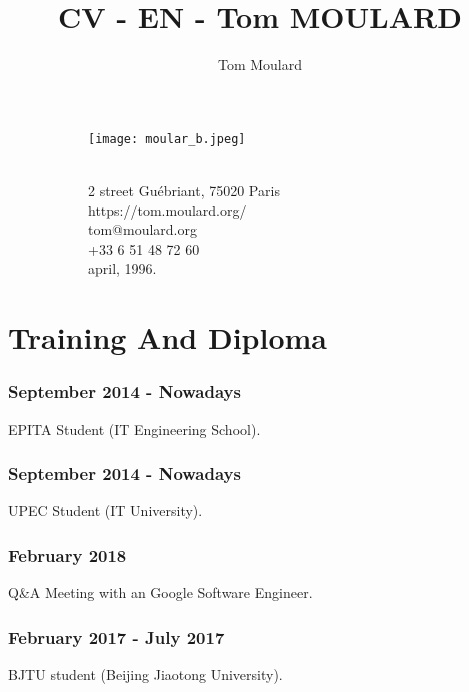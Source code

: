 \documentclass{article}
\begin{document}
    \title{CV - EN - Tom MOULARD}
    \author{Tom Moulard}

    \begin{center}
        \begin{figure}
            \centering
            \begin{subfigure}[b]{0.3\textwidth}
                \texttt{[image: moular\_b.jpeg]}
            \end{subfigure}
            \begin{subfigure}[b]{0.3\textwidth}
                {\huge\bfseries\theauthor}\\
                2 street Gu\'ebriant, 75020 Paris\\
                https://tom.moulard.org/\\
                tom@moulard.org\\
                +33 6 51 48 72 60\\
                april,  1996.
            \end{subfigure}
        \end{figure}
    \end{center}
\vspace{-1cm}
    \section{Training And Diploma}
        \subsubsection{September 2014 - Nowadays}
            EPITA Student (IT Engineering School).
        \subsubsection{September 2014 - Nowadays}
            UPEC Student (IT University).
        \subsubsection{February 2018}
            Q{\&}A Meeting with an Google Software Engineer.
        \subsubsection{February 2017 - July 2017}
            BJTU student (Beijing Jiaotong University).
\end{document}
